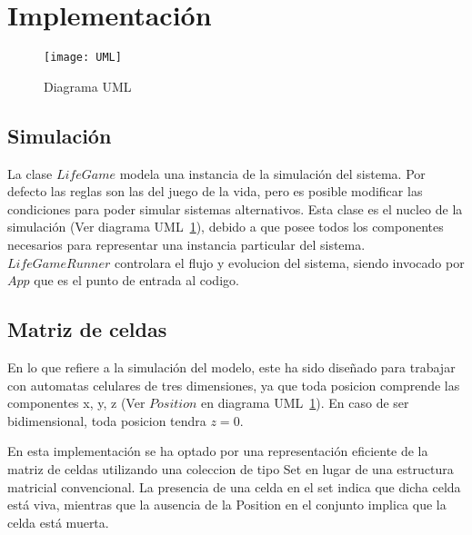 \section{Implementación}\label{sec:implementacion}

\begin{figure}[H]
    \centering
    \texttt{[image: UML]}
    \caption{Diagrama UML}
    \label{fig:UML-Simulacion}
\end{figure}

\subsection{Simulación}\label{label:simulacion}
    La clase $LifeGame$ modela una instancia de la simulación del sistema. Por defecto las reglas son las del juego de la vida,
    pero es posible modificar las condiciones para poder simular sistemas alternativos. Esta clase es el nucleo de la
    simulación (Ver diagrama UML~\ref{fig:UML-Simulacion}), debido a que posee todos los componentes necesarios
    para representar una instancia particular del sistema. $LifeGameRunner$ controlara el flujo y evolucion del sistema,
    siendo invocado por $App$ que es el punto de entrada al codigo.

\subsection{Matriz de celdas}\label{subsec:matriz de celdas}
    En lo que refiere a la simulación del modelo, este ha sido diseñado para trabajar con automatas celulares de tres
    dimensiones, ya que toda posicion comprende las componentes x, y, z (Ver $Position$ en diagrama UML~\ref{fig:UML-Simulacion}).
    En caso de ser bidimensional, toda posicion tendra $z = 0$.

    En esta implementación se ha optado por una representación eficiente de la matriz de celdas utilizando una coleccion de
    tipo Set en lugar de una estructura matricial convencional.
    La presencia de una celda en el set indica que dicha celda está viva, mientras que la ausencia de la Position en
    el conjunto implica que la celda está muerta.

